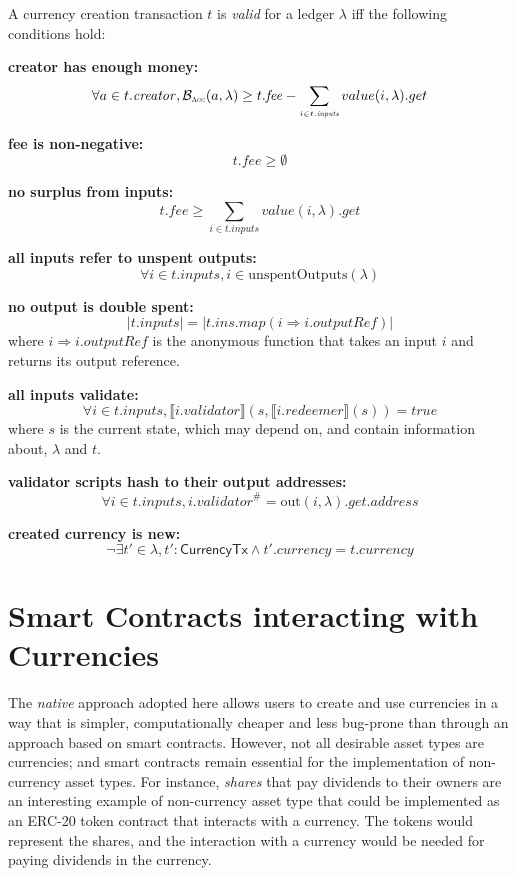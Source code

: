 \documentclass{llncs}
\newcommand{\hash}[1]{#1^{\scriptscriptstyle\#}}
\newcommand{\type}[1]{\mathsf{#1}}
\newcommand{\currencyCreationT}{\type{CurrencyTx}}
\newcommand{\field}[1]{\mathit{#1}}
\newcommand{\ins}{\field{inputs}}
\newcommand{\fee}{\field{fee}}
\newcommand{\address}{\field{address}}
\newcommand{\outputRef}{\field{outputRef}}
\newcommand{\validator}{\field{validator}}
\newcommand{\redeemer}{\field{redeemer}}
\newcommand{\creator}{\field{creator}}
\newcommand{\currency}{\field{currency}}
\newcommand{\func}[1]{\mathrm{#1}}
\newcommand{\outputSpentBy}{\func{out}}
\newcommand{\unspentOuts}{\func{unspentOutputs}}
\newcommand{\true}{\field{true}}
\newcommand{\interpret}[1]{\llbracket #1 \rrbracket}
\newcommand{\balance}{\mathcal{B}}
\newcommand{\accountBalance}{\balance_{\scriptscriptstyle\mathrm{\textsc{Acc}}}}
\newenvironment{smallish}{
	\begin{small}
}{
	\end{small}
}
\begin{document}
\begin{definition}
\label{def:Valid-Currency-Creation}
A currency creation transaction $t$ is \emph{valid} for a ledger $\lambda$ 
iff the following conditions hold:

\begin{smallish}
\textbf{creator has enough money:}
$$\forall a \in t.\creator, \accountBalance(a, \lambda) \ge t.\fee - \sum_{\scriptscriptstyle i \in t.\ins}value(i, \lambda).get$$

\textbf{fee is non-negative:}
$$t.\fee \ge \emptyset$$

\textbf{no surplus from inputs:}
$$t.\fee \ge \sum_{\scriptscriptstyle i \in t.\ins} value(i, \lambda).get$$

\textbf{all inputs refer to unspent outputs:}
$$\forall i \in t.\ins, i \in \unspentOuts(\lambda)$$

\textbf{no output is double spent:}
$$|t.\ins| = |t.ins.map(i \Rightarrow i.\outputRef)|$$
where $i \Rightarrow i.\outputRef$ is the anonymous function that takes an input $i$ and returns its output reference.

\textbf{all inputs validate:}
$$\forall i \in t.\ins, \interpret{i.\validator}(s, \interpret{i.\redeemer}(s)) = \true$$
where $s$ is the current state, which may depend on, and contain information about, $\lambda$ and $t$.

\textbf{validator scripts hash to their output addresses:}
$$\forall i \in t.\ins, \hash{i.\validator} = \outputSpentBy(i, \lambda).get.\address$$

\textbf{created currency is new:}
$$\neg \exists t' \in \lambda, t'\colon \currencyCreationT \wedge t'.\currency = t.\currency$$
\end{smallish}
\end{definition}





\section{Smart Contracts interacting with Currencies}
\label{sec:SmartContracts}

The \emph{native} approach adopted here allows users to create and use currencies in a way that is simpler, computationally cheaper and less bug-prone than through an approach based on smart contracts. However, not all desirable asset types are currencies; and smart contracts remain essential for the implementation of non-currency asset types. For instance, \emph{shares} that pay dividends to their owners are an interesting example of non-currency asset type that could be implemented as an ERC-20 token contract that interacts with a currency. The tokens would represent the shares, and the interaction with a currency would be needed for paying dividends in the currency.
\end{document}

